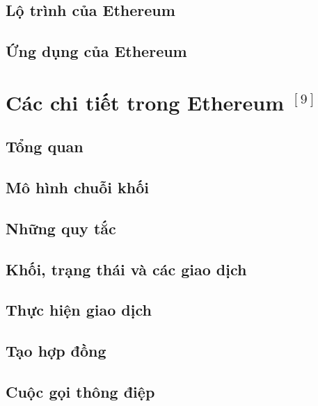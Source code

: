 \documentclass[12pt]{article}
\begin{document}
		\subsection{Lộ trình của Ethereum}
		
		
		\subsection{Ứng dụng của Ethereum}
		
	
	\newpage
	\section{Các chi tiết trong Ethereum $^{[9]}$}
		\subsection{Tổng quan}
		
	
		\subsection{Mô hình chuỗi khối}
		
	
		\subsection{Những quy tắc}
		
	
		\subsection{Khối, trạng thái và các giao dịch}
		
		
		\subsection{Thực hiện giao dịch}
		
		
		\subsection{Tạo hợp đồng}
			
	
		\subsection{Cuộc gọi thông điệp}
				
		
\end{document}
